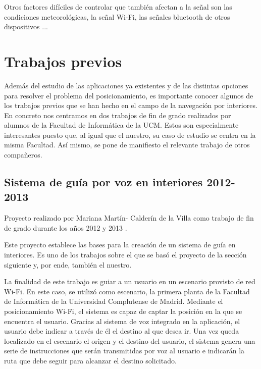 Otros factores difíciles de controlar que también afectan a la señal son las condiciones meteorológicas, la señal Wi-Fi, las señales bluetooth de otros dispositivos \citep{beaconsinterferences}...


\section{Trabajos previos}

Además del estudio de las aplicaciones ya existentes y de las distintas opciones para resolver el problema del posicionamiento, es importante conocer algunos de los trabajos previos que se han hecho en el campo de la navegación por interiores. En concreto nos centramos en dos trabajos de fin de grado realizados por alumnos de la Facultad de Informática de la UCM. Estos son especialmente interesantes puesto que, al igual que el nuestro, su caso de estudio se centra en la misma Facultad. Así mismo, se pone de manifiesto el relevante trabajo de otros compañeros.


\subsection{Sistema de guía por voz en interiores 2012-2013}

Proyecto realizado por Mariana Martín- Calderín de la Villa como trabajo de fin de grado durante los años 2012 y 2013 \citep{TFGMariana}.

Este proyecto establece las bases para la creación de un sistema de guía en interiores. Es uno de los trabajos sobre el que se basó el proyecto de la sección siguiente y, por ende, también el nuestro. 

La finalidad de este trabajo es guiar a un usuario en un escenario provisto de red Wi-Fi. En este caso, se utilizó como escenario, la primera planta de la Facultad de Informática de la Universidad Complutense de Madrid. Mediante el posicionamiento Wi-Fi, el sistema es capaz de captar la posición en la que se encuentra el usuario. Gracias al sistema de voz integrado en la aplicación, el usuario debe indicar a través de él el destino al que desea ir. Una vez queda localizado en el escenario el origen y el destino del usuario, el sistema genera una serie de instrucciones que serán transmitidas por voz al usuario e indicarán la ruta que debe seguir para alcanzar el destino solicitado.

